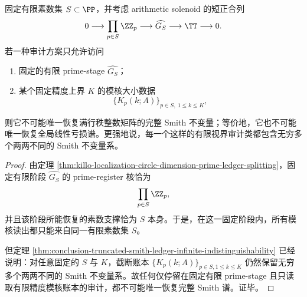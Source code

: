 \begin{corollary}\label{cor:conclusion-finite-prime-stage-solenoid-smith-incompleteness}
固定有限素数集 \(S\subset\PP\)，并考虑 arithmetic solenoid 的短正合列
\[
0\longrightarrow \prod_{p\in S}\ZZ_p\longrightarrow \widehat{G_S}\longrightarrow \TT\longrightarrow 0.
\]
若一种审计方案只允许访问
\begin{enumerate}
  \item 固定的有限 prime-stage \(\widehat{G_S}\)；
  \item 某个固定精度上界 \(K\) 的模核大小数据
  \[
  \bigl\{K_p(k;A)\bigr\}_{p\in S,\ 1\le k\le K},
  \]
\end{enumerate}
则它不可能唯一恢复满行秩整数矩阵的完整 Smith 不变量；等价地，它也不可能唯一恢复全局线性亏损谱。更强地说，每一个这样的有限视界审计类都包含无穷多个两两不同的 Smith 不变量系。
\end{corollary}
\begin{proof}
由定理 \ref{thm:killo-localization-circle-dimension-prime-ledger-splitting}，固定有限阶段 \(\widehat{G_S}\) 的 prime-register 核恰为
\[
\prod_{p\in S}\ZZ_p,
\]
并且该阶段所能恢复的素数支撑恰为 \(S\) 本身。于是，在这一固定阶段内，所有模核读出都只能来自同一有限素数集 \(S\)。

但定理 \ref{thm:conclusion-truncated-smith-ledger-infinite-indistinguishability} 已经说明：对任意固定的 \(S\) 与 \(K\)，截断账本
\(
\{K_p(k;A)\}_{p\in S,1\le k\le K}
\)
仍然保留无穷多个两两不同的 Smith 不变量系。故任何仅停留在固定有限 prime-stage 且只读取有限精度模核账本的审计，都不可能唯一恢复完整 Smith 谱。证毕。
\end{proof}

